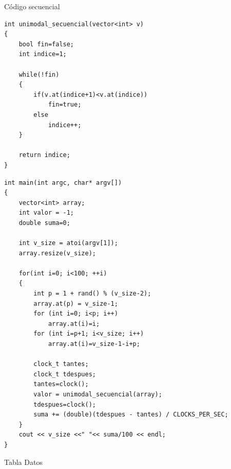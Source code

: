 \documentclass[12pt]{beamer}
\begin{document}
\begin{frame}[fragile]{Código secuencial}
	\begin{lstlisting}
int unimodal_secuencial(vector<int> v)
{
	bool fin=false;
  	int indice=1;

  	while(!fin)
  	{
     	if(v.at(indice+1)<v.at(indice))
      		fin=true;
     	else
      		indice++;
  	}

  	return indice;
}
	\end{lstlisting}
\end{frame}

\begin{frame}[fragile]
	\begin{lstlisting}
int main(int argc, char* argv[])
{
	vector<int> array;
  	int valor = -1;
	double suma=0;

  	int v_size = atoi(argv[1]);
  	array.resize(v_size);

	for(int i=0; i<100; ++i)
	{
		int p = 1 + rand() % (v_size-2);
  		array.at(p) = v_size-1;
  		for (int i=0; i<p; i++)
  			array.at(i)=i;
  		for (int i=p+1; i<v_size; i++)
  			array.at(i)=v_size-1-i+p;

  		clock_t tantes;
  		clock_t tdespues;
  		tantes=clock();
  		valor = unimodal_secuencial(array);
  		tdespues=clock();
		suma += (double)(tdespues - tantes) / CLOCKS_PER_SEC;
	}
  	cout << v_size <<" "<< suma/100 << endl;
}
	\end{lstlisting}

\end{frame}

\begin{frame}{Tabla Datos}


\end{frame}
\end{document}

